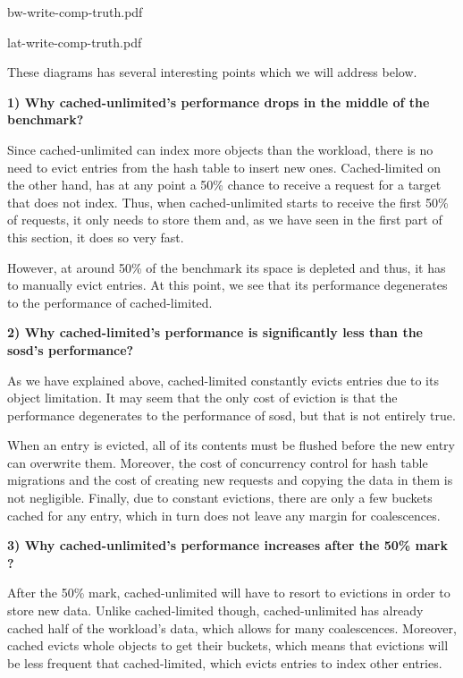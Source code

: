 {bw-write-comp-truth.pdf}

{lat-write-comp-truth.pdf}

These diagrams has several interesting points which we will address below.

\textbf{1) Why cached-unlimited's performance drops in the middle of the 
	benchmark?}

Since cached-unlimited can index more objects than the workload, there is no 
need to evict entries from the hash table to insert new ones. Cached-limited on 
the other hand, has at any point a 50\% chance to receive a request for a 
target that does not index. Thus, when cached-unlimited starts to receive the 
first 50\% of requests, it only needs to store them and, as we have seen in the 
first part of this section, it does so very fast.

However, at around 50\% of the benchmark its space is depleted and thus, it has 
to manually evict entries. At this point, we see that its performance 
degenerates to the performance of cached-limited.

\textbf{2) Why cached-limited's performance is significantly less than the 
	sosd's performance?}

As we have explained above, cached-limited constantly evicts entries due to its 
object limitation. It may seem that the only cost of eviction is that the 
performance degenerates to the performance of sosd, but that is not entirely 
true.

When an entry is evicted, all of its contents must be flushed before the new 
entry can overwrite them. Moreover, the cost of concurrency control for hash 
table migrations and the cost of creating new requests and copying the data in 
them is not negligible. Finally, due to constant evictions, there are only a 
few buckets cached for any entry, which in turn does not leave any margin for 
coalescences.

\textbf{3) Why cached-unlimited's performance increases after the 50\% mark ?}

After the 50\% mark, cached-unlimited will have to resort to evictions in order 
to store new data. Unlike cached-limited though, cached-unlimited has already 
cached half of the workload's data, which allows for many coalescences.  
Moreover, cached evicts whole objects to get their buckets, which means that 
evictions will be less frequent that cached-limited, which evicts entries to 
index other entries.

